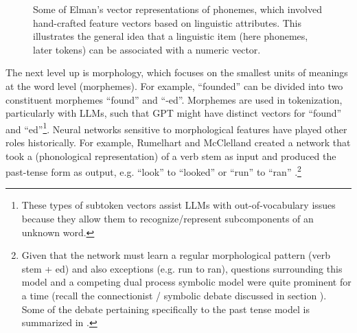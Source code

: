 \begin{figure}[h]
\centering
{}
\caption[From \cite{elman1990finding}.]{Some of Elman's vector representations of phonemes, which involved hand-crafted feature vectors based on linguistic attributes. This illustrates the general idea that a linguistic item (here phonemes, later tokens) can be associated with a numeric vector. }
\label{elmanWordEmbeddings}
\end{figure}

The next level up is morphology, which focuses on the smallest units of meanings at the word level (morphemes). For example, ``founded'' can be divided into two constituent morphemes ``found'' and ``-ed''.  Morphemes are used in tokenization, particularly with LLMs, such that GPT might have distinct vectors for ``found'' and ``ed''\footnote{These types of subtoken vectors assist LLMs with out-of-vocabulary issues because they allow them to recognize/represent subcomponents of an unknown word.}.  Neural networks sensitive to morphological features have played other roles historically. For example, Rumelhart and McClelland created a network that took a (phonological representation) of a verb stem as input and produced the past-tense form as output, e.g. ``look'' to ``looked'' or ``run'' to ``ran'' \cite{rumelhart1986learning}.\footnote{Given that the network must learn a regular morphological pattern (verb stem + ed) and also exceptions (e.g. run to ran), questions surrounding this model and a competing dual process symbolic model were quite prominent for a time (recall the connectionist / symbolic debate discussed in section ). Some of the debate pertaining specifically to the past tense model is summarized in \cite{pinker2002past}.}

